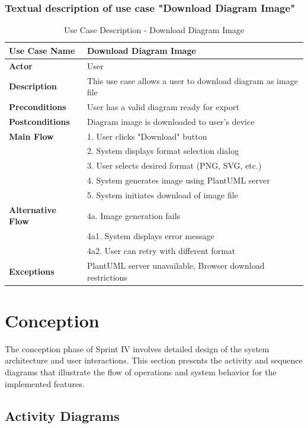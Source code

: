 \subsubsection{Textual description of use case "Download Diagram Image"}
\begin{table}[H]
\centering
\caption{Use Case Description - Download Diagram Image}
\begin{tabular}{|l|p{10cm}|}
\hline
\textbf{Use Case Name} & Download Diagram Image \\
\hline
\textbf{Actor} & User \\
\hline
\textbf{Description} & This use case allows a user to download diagram as image file \\
\hline
\textbf{Preconditions} & User has a valid diagram ready for export \\
\hline
\textbf{Postconditions} & Diagram image is downloaded to user's device \\
\hline
\textbf{Main Flow} & 1. User clicks "Download" button \\
& 2. System displays format selection dialog \\
& 3. User selects desired format (PNG, SVG, etc.) \\
& 4. System generates image using PlantUML server \\
& 5. System initiates download of image file \\
\hline
\textbf{Alternative Flow} & 4a. Image generation fails \\
& 4a1. System displays error message \\
& 4a2. User can retry with different format \\
\hline
\textbf{Exceptions} & PlantUML server unavailable, Browser download restrictions \\
\hline
\end{tabular}
\end{table}

\section{Conception}

The conception phase of Sprint IV involves detailed design of the system architecture and user interactions. This section presents the activity and sequence diagrams that illustrate the flow of operations and system behavior for the implemented features.

\subsection{Activity Diagrams}

